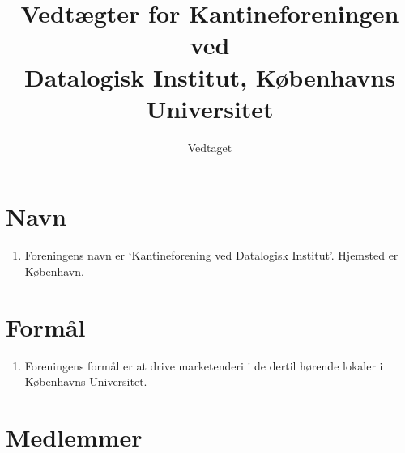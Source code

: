 \documentclass[a4paper, 10pt]{article}
\title{Vedtægter for Kantineforeningen ved \\ Datalogisk Institut,
Københavns Universitet}
\author{}
\date{Vedtaget \vedtagsdato{}}
\newenvironment{stykenum}{
  \begin{enumerate}[%
    label=Stk.~\arabic*., ref=\textsection~\theenumi~Stk.~\arabic*, start=1]
}{\end{enumerate}}
\begin{document}
\maketitle
\thispagestyle{first}

\section{Navn}

\begin{stykenum}
\item 
\label{navn} Foreningens navn er `Kantineforening ved Datalogisk Institut'. 
Hjemsted er København.
\end{stykenum}

\section{Formål}

\begin{stykenum}
    \item 
    \label{formaal} Foreningens formål er at drive marketenderi i de
    dertil hørende lokaler i Kø\-benhavns Universitet.
\end{stykenum}

\section{Medlemmer}
\end{document}
